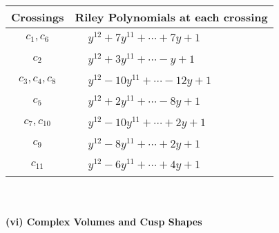 \documentclass[1p]{elsarticle_modified}
\theoremstyle{definition}
\begin{document}
\begin{tabular}{m{50pt}|m{274pt}}
Crossings & \hspace{64pt}Riley Polynomials at each crossing \\
\hline $$\begin{aligned}c_{1},c_{6}\end{aligned}$$&$\begin{aligned}
&y^{12}+7 y^{11}+\cdots+7 y+1
\end{aligned}$\\
\hline $$\begin{aligned}c_{2}\end{aligned}$$&$\begin{aligned}
&y^{12}+3 y^{11}+\cdots- y+1
\end{aligned}$\\
\hline $$\begin{aligned}c_{3},c_{4},c_{8}\end{aligned}$$&$\begin{aligned}
&y^{12}-10 y^{11}+\cdots-12 y+1
\end{aligned}$\\
\hline $$\begin{aligned}c_{5}\end{aligned}$$&$\begin{aligned}
&y^{12}+2 y^{11}+\cdots-8 y+1
\end{aligned}$\\
\hline $$\begin{aligned}c_{7},c_{10}\end{aligned}$$&$\begin{aligned}
&y^{12}-10 y^{11}+\cdots+2 y+1
\end{aligned}$\\
\hline $$\begin{aligned}c_{9}\end{aligned}$$&$\begin{aligned}
&y^{12}-8 y^{11}+\cdots+2 y+1
\end{aligned}$\\
\hline $$\begin{aligned}c_{11}\end{aligned}$$&$\begin{aligned}
&y^{12}-6 y^{11}+\cdots+4 y+1
\end{aligned}$\\
\hline
\end{tabular}\\~\\
\newpage\flushleft \textbf{(vi) Complex Volumes and Cusp Shapes}
\end{document}
